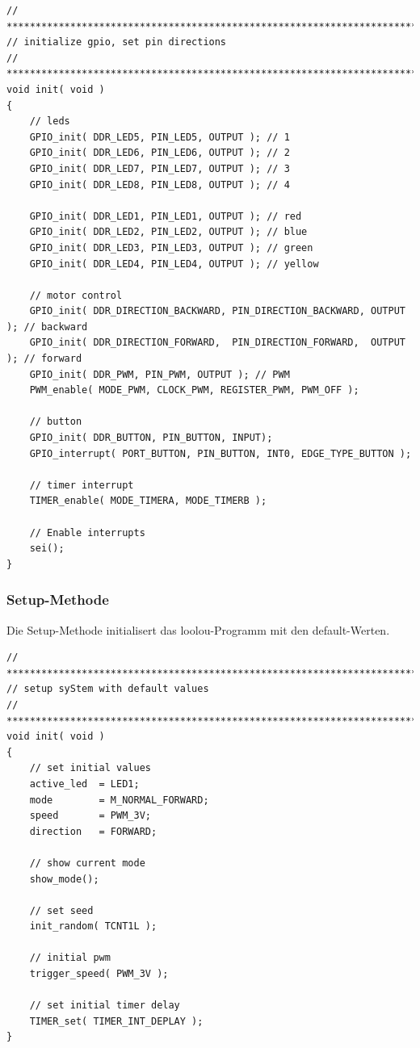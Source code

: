 \vspace{0.5cm}
\begin{lstlisting}[caption={Setup-Method},label=lst:setup]
// ****************************************************************************
// initialize gpio, set pin directions
// ***************************************************************************/
void init( void )
{
	// leds
	GPIO_init( DDR_LED5, PIN_LED5, OUTPUT ); // 1
	GPIO_init( DDR_LED6, PIN_LED6, OUTPUT ); // 2
	GPIO_init( DDR_LED7, PIN_LED7, OUTPUT ); // 3
	GPIO_init( DDR_LED8, PIN_LED8, OUTPUT ); // 4

	GPIO_init( DDR_LED1, PIN_LED1, OUTPUT ); // red
	GPIO_init( DDR_LED2, PIN_LED2, OUTPUT ); // blue
	GPIO_init( DDR_LED3, PIN_LED3, OUTPUT ); // green
	GPIO_init( DDR_LED4, PIN_LED4, OUTPUT ); // yellow

	// motor control
	GPIO_init( DDR_DIRECTION_BACKWARD, PIN_DIRECTION_BACKWARD, OUTPUT ); // backward
	GPIO_init( DDR_DIRECTION_FORWARD,  PIN_DIRECTION_FORWARD,  OUTPUT ); // forward
	GPIO_init( DDR_PWM, PIN_PWM, OUTPUT ); // PWM
	PWM_enable( MODE_PWM, CLOCK_PWM, REGISTER_PWM, PWM_OFF );

	// button
	GPIO_init( DDR_BUTTON, PIN_BUTTON, INPUT);
	GPIO_interrupt( PORT_BUTTON, PIN_BUTTON, INT0, EDGE_TYPE_BUTTON );

	// timer interrupt
	TIMER_enable( MODE_TIMERA, MODE_TIMERB );

	// Enable interrupts
	sei();
}
\end{lstlisting}
\vspace{0.5cm}

\subsubsection{Setup-Methode}

Die Setup-Methode initialisert das loolou-Programm mit den default-Werten.

\vspace{0.5cm}
\begin{lstlisting}[caption={Init-Method},label=lst:init]
// ****************************************************************************
// setup syStem with default values
// ***************************************************************************/
void init( void )
{
	// set initial values
	active_led  = LED1;
	mode        = M_NORMAL_FORWARD;
	speed       = PWM_3V;
	direction   = FORWARD;

	// show current mode
	show_mode();

	// set seed
	init_random( TCNT1L );

	// initial pwm
	trigger_speed( PWM_3V );

	// set initial timer delay
	TIMER_set( TIMER_INT_DEPLAY );
}
\end{lstlisting}
\vspace{0.5cm}

